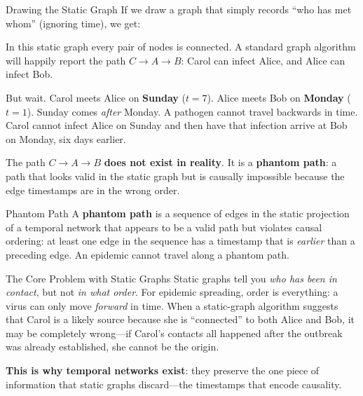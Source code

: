 \begin{examplebox}{Drawing the Static Graph}
If we draw a graph that simply records ``who has met whom'' (ignoring time), we get:

\medskip
\begin{center}
\end{center}

\medskip
In this static graph every pair of nodes is connected. A standard graph algorithm will
happily report the path $C \to A \to B$: Carol can infect Alice, and Alice can infect Bob.

But wait. Carol meets Alice on \textbf{Sunday} ($t=7$). Alice meets Bob on \textbf{Monday}
($t=1$). Sunday comes \textit{after} Monday. A pathogen cannot travel backwards in time. Carol
cannot infect Alice on Sunday and then have that infection arrive at Bob on Monday, six days
earlier.

The path $C \to A \to B$ \textbf{does not exist in reality}. It is a \textbf{phantom path}:
a path that looks valid in the static graph but is causally impossible because the edge
timestamps are in the wrong order.
\end{examplebox}

\begin{conceptbox}{Phantom Path}
A \textbf{phantom path} is a sequence of edges in the static projection of a temporal network
that appears to be a valid path but violates causal ordering: at least one edge in the sequence
has a timestamp that is \textit{earlier} than a preceding edge. An epidemic cannot travel
along a phantom path.
\end{conceptbox}

\begin{keyinsight}{The Core Problem with Static Graphs}
Static graphs tell you \textit{who has been in contact}, but not \textit{in what order}. For
epidemic spreading, order is everything: a virus can only move \emph{forward} in time. When a
static-graph algorithm suggests that Carol is a likely source because she is ``connected'' to
both Alice and Bob, it may be completely wrong---if Carol's contacts all happened after the
outbreak was already established, she cannot be the origin.

\textbf{This is why temporal networks exist}: they preserve the one piece of information that
static graphs discard---the timestamps that encode causality.
\end{keyinsight}

